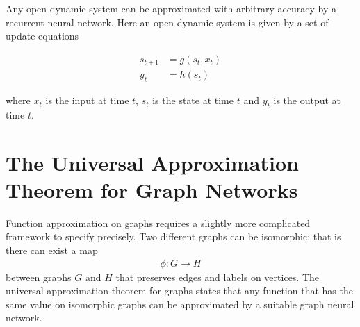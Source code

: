 \documentclass[book.tex]{subfiles}
\begin{document}
Any open dynamic system can be approximated with arbitrary accuracy by a recurrent neural network. Here an open dynamic system is given by a set of update equations

\begin{align}
s_{t+1} &= g(s_t, x_t)\\
y_t &= h(s_t)
\end{align}

where $x_t$ is the input at time $t$, $s_t$ is the state at time $t$ and $y_t$ is the output at time $t$.

\section{The Universal Approximation Theorem for Graph Networks}

Function approximation on graphs requires a slightly more complicated framework to specify precisely. Two different graphs can be isomorphic; that is there can exist a map
\begin{align}
\phi: G \to H
\end{align}
between graphs $G$ and $H$ that preserves edges and labels on vertices. The universal approximation theorem for graphs states that any function that has the same value on isomorphic graphs can be approximated by a suitable graph neural network.

\end{document}
